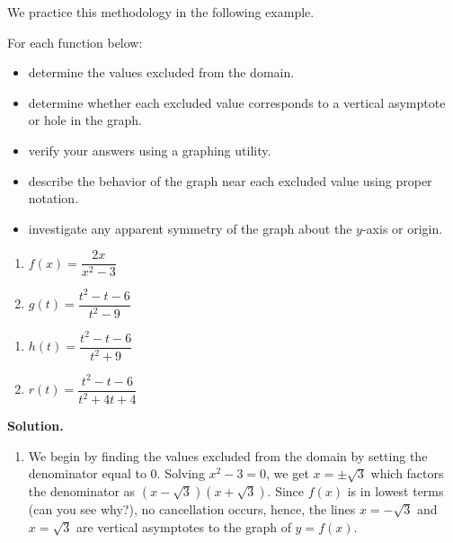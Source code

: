 We practice this methodology in the following example.


\begin{ex}  \label{vavsholeexample}  For each function below:

\begin{itemize}

\item  determine the values excluded from the domain.

\item   determine whether each excluded value corresponds to a vertical asymptote or hole in the graph.

\item  verify your answers using a graphing utility.

\item  describe the behavior of the graph near each excluded value using proper notation.  

\item  investigate any apparent symmetry of the graph about the $y$-axis or origin.

\end{itemize}

\begin{multicols}{2}
\begin{enumerate}

\item  $f(x) = \dfrac{2x}{x^2-3}$

\item  $g(t) = \dfrac{t^2-t-6}{t^2-9}$

\setcounter{HW}{\value{enumi}}
\end{enumerate}
\end{multicols}

\begin{multicols}{2}
\begin{enumerate}
\setcounter{enumi}{\value{HW}}


\item  $h(t) = \dfrac{t^2-t-6}{t^2+9}$

\item  $r(t) = \dfrac{t^2-t-6}{t^2+4t+4}$

\setcounter{HW}{\value{enumi}}
\end{enumerate}
\end{multicols}


{ \bf Solution.} 

\begin{enumerate}

\item  We begin by finding the values excluded from the domain by setting the denominator equal to $0$.  Solving $x^2 - 3 = 0$, we get $x = \pm \sqrt{3}$ which factors the denominator as $(x-\sqrt{3})(x+\sqrt{3})$.  Since  $f(x)$ is in lowest terms (can you see why?), no cancellation occurs,   hence,  the lines $x = -\sqrt{3}$ and $x=\sqrt{3}$ are vertical asymptotes to the graph of $y=f(x)$.  


\end{enumerate}
\end{ex}

